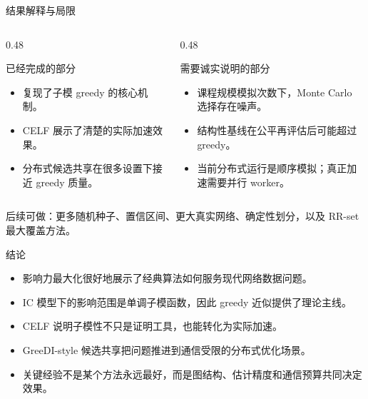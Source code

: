 \documentclass[UTF8, 10pt, aspectratio=169]{ctexbeamer}
\begin{document}
\begin{frame}{结果解释与局限}
    \begin{columns}[T,onlytextwidth]
        \begin{column}{0.48\linewidth}
            \begin{block}{已经完成的部分}
                \begin{itemize}
                    \item 复现了子模 greedy 的核心机制。
                    \item CELF 展示了清楚的实际加速效果。
                    \item 分布式候选共享在很多设置下接近 greedy 质量。
                \end{itemize}
            \end{block}
        \end{column}
        \begin{column}{0.48\linewidth}
            \begin{block}{需要诚实说明的部分}
                \begin{itemize}
                    \item 课程规模模拟次数下，Monte Carlo 选择存在噪声。
                    \item 结构性基线在公平再评估后可能超过 greedy。
                    \item 当前分布式运行是顺序模拟；真正加速需要并行 worker。
                \end{itemize}
            \end{block}
        \end{column}
    \end{columns}
    \vspace{0.4em}
    \small 后续可做：更多随机种子、置信区间、更大真实网络、确定性划分，以及 RR-set 最大覆盖方法。
\end{frame}

\begin{frame}{结论}
    \begin{itemize}
        \item 影响力最大化很好地展示了经典算法如何服务现代网络数据问题。
        \item IC 模型下的影响范围是单调子模函数，因此 greedy 近似提供了理论主线。
        \item CELF 说明子模性不只是证明工具，也能转化为实际加速。
        \item GreeDI-style 候选共享把问题推进到通信受限的分布式优化场景。
        \item 关键经验不是某个方法永远最好，而是图结构、估计精度和通信预算共同决定效果。
    \end{itemize}
\end{frame}
\end{document}
